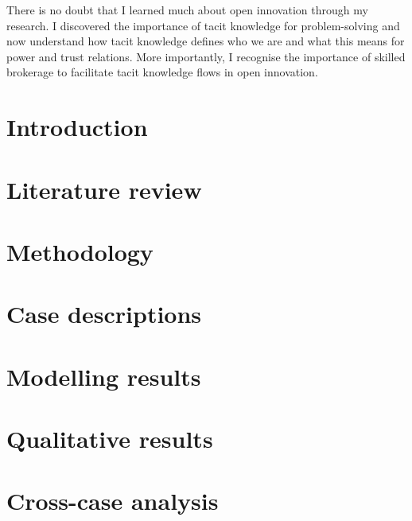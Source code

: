 \documentclass[12pt,table,xcdraw]{book}
\begin{document}
There is no doubt that I learned much about open innovation through my research. I discovered the importance of tacit knowledge for problem-solving and now understand how tacit knowledge defines who we are and what this means for power and trust relations. More importantly, I recognise the importance of skilled brokerage to facilitate tacit knowledge flows in open innovation. 

\newpage
\setcounter{tocdepth}{3}
\tableofcontents

\newpage

\listoffigures

\newpage

\listoftables

\mainmatter

\chapter{Introduction} \label{chp:intro}


\chapter{Literature review} \label{chp:lit_review}


\chapter{Methodology} \label{chp:methodology}


\chapter{Case descriptions} \label{chp:case_overview}


\chapter{Modelling results} \label{chp:ergm_result}

%
\chapter{Qualitative results} \label{chp:qual_analysis}

%
\chapter{Cross-case analysis} \label{chp:cross_case}

%
\end{document}
